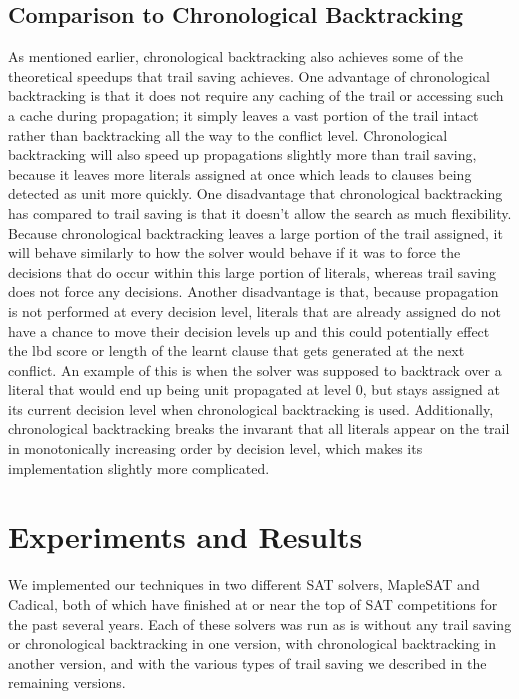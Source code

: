 \documentclass{article}
\begin{document}
\subsection{Comparison to Chronological Backtracking}
As mentioned earlier, chronological backtracking also achieves some of the theoretical speedups that trail saving achieves. One advantage of chronological backtracking is that it does not require any caching of the trail or accessing such a cache during propagation; it simply leaves a vast portion of the trail intact rather than backtracking all the way to the conflict level. Chronological backtracking will also speed up propagations slightly more than trail saving, because it leaves more literals assigned at once which leads to clauses being detected as unit more quickly. One disadvantage that chronological backtracking has compared to trail saving is that it doesn't allow the search as much flexibility. Because chronological backtracking leaves a large portion of the trail assigned, it will behave similarly to how the solver would behave if it was to force the decisions that do occur within this large portion of literals, whereas trail saving does not force any decisions. Another disadvantage is that, because propagation is not performed at every decision level, literals that are already assigned do not have a chance to move their decision levels up and this could potentially effect the lbd score or length of the learnt clause that gets generated at the next conflict. An example of this is when the solver was supposed to backtrack over a literal that would end up being unit propagated at level 0, but stays assigned at its current decision level when chronological backtracking is used. Additionally, chronological backtracking breaks the invarant that all literals appear on the trail in monotonically increasing order by decision level, which makes its implementation slightly more complicated.

\section{Experiments and Results}
We implemented our techniques in two different SAT solvers, MapleSAT and Cadical, both of which have finished at or near the top of SAT competitions for the past several years. Each of these solvers was run as is without any trail saving or chronological backtracking in one version, with chronological backtracking in another version, and with the various types of trail saving we described in the remaining versions.
\end{document}
